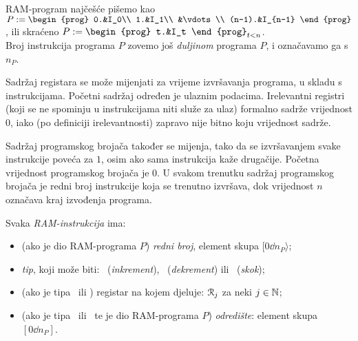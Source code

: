 RAM-program najčešće pišemo kao %
$P:=\begin{prog}
    0.&I_0\\
    1.&I_1\\
    &\vdots\\
    (n-1).&I_{n-1}
    \end{prog}$, ili skraćeno $P:=\begin{prog}
    t.&I_t
    \end{prog}_{t<n}$.\\
Broj instrukcija programa $P$ zovemo još \emph{duljinom} programa $P$, i označavamo ga s $n_P$.

Sadržaj registara se može mijenjati za vrijeme izvršavanja programa, u skladu s instrukcijama. Početni sadržaj određen je ulaznim podacima. Irelevantni registri (koji se ne spominju u instrukcijama niti služe za ulaz) formalno sadrže vrijednost $0$, iako (po definiciji irelevantnosti) zapravo nije bitno koju vrijednost sadrže.

Sadržaj programskog brojača također se mijenja, tako da se iz\-vr\-ša\-va\-njem svake instrukcije poveća za $1$, osim ako sama instrukcija kaže drugačije. Početna vrijednost programskog brojača je $0$. U svakom trenutku sadržaj programskog brojača je redni broj instrukcije koja se trenutno izvršava, dok vrijednost $n$ označava kraj izvođenja programa.

\begin{definicija}[{name=[RAM-instrukcija]}]\label{def:ins}
Svaka \emph{RAM-instrukcija} ima:
\begin{itemize}
    \item (ako je dio RAM-programa $P$) \emph{redni broj}, element skupa $[0\dd n_P\rangle$;
    \item \emph{tip}, koji može biti: \inc\ (\hspace{-1pt}\emph{inkrement}\/), \dec\ (\hspace{-1pt}\emph{dekrement}\/) ili \goto\ (\hspace{-1pt}\emph{skok}\/);
    \item (ako je tipa \inc\ ili \dec) registar na kojem djeluje: $\mathcal R_{j}$ za neki $j\in{\mathbb N}$;
    \item (ako je tipa \dec\ ili \goto\ te je dio RAM-programa $P$) \emph{odredište}: element skupa $[0\dd n_P]$.
    \qedhere
\end{itemize}
\end{definicija}

